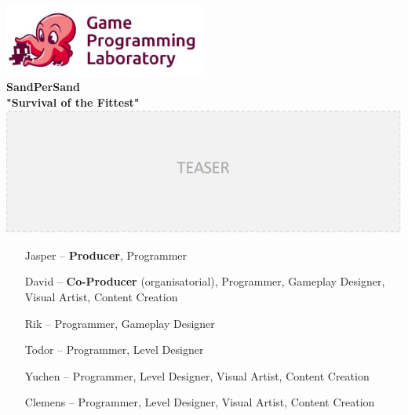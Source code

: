 \documentclass[a4paper,twoside,12pt,chapterprefix=false]{scrbook}
\begin{document}
\begin{titlepage}
	\oddsidemargin 0.0cm
	\evensidemargin 0.0cm
	
	\raggedleft \includegraphics*[width=0.5\textwidth]{figures/gpl_logo} \\
	
	\centering
	\Huge
	\vspace{2.0cm}
	\textbf{\textsf{SandPerSand}} \\[1.0cm]
	\large
	\textbf{\textsf{"Survival of the Fittest"}} \\[1.0cm]
	\includegraphics*[width=1.0\textwidth]{figures/teaser_temp} \\ [2.0cm]
	
	\sffamily
	\raggedright
	\vfill
	
	\large
	
	
	\begin{itemize}
	    \item[Jasper --]
	     \textbf{Producer}, Programmer \\
	    \item[David --]
	     \textbf{Co-Producer} (organisatorial), Programmer, Gameplay Designer, Visual Artist, Content Creation
	     \item[Rik --] 
	     Programmer, Gameplay Designer 
	     \item[Todor --]
	     Programmer, Level Designer 
	     \item[Yuchen --]
	     Programmer, Level Designer, Visual Artist, Content Creation
	     \item[Clemens --]
	     Programmer, Level Designer, Visual Artist, Content Creation
	\end{itemize}
	
\end{titlepage}
\clearemptydoublepage
\end{document}
